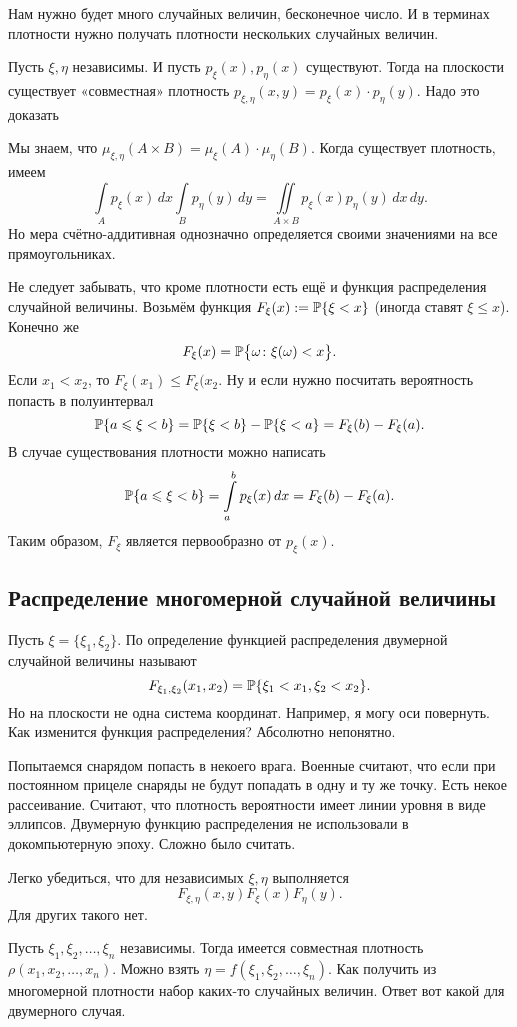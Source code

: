 Нам нужно будет много случайных величин, бесконечное число. И в терминах плотности нужно получать плотности нескольких случайных величин.

Пусть $\xi,\eta$ независимы. И пусть $p_\xi(x),p_\eta(x)$ существуют.
Тогда на плоскости существует «совместная» плотность $p_{\xi,\eta}(x,y) = p_\xi(x)\cdot p_\eta(y)$. Надо это доказать
\begin{Proof}
Мы знаем, что $\mu_{\xi,\eta}(A\times B) = \mu_\xi(A)\cdot \mu_\eta(B)$. Когда существует плотность, имеем
\[
  \int\limits_A p_\xi(x)\,dx \int\limits_B p_\eta(y)\,dy = \iint\limits_{A\times B} p_\xi(x)p_\eta(y) \,dx\,dy.
\]
Но мера счётно-аддитивная однозначно определяется своими значениями на все прямоугольниках.
\end{Proof}

Не следует забывать, что кроме плотности есть ещё и функция распределения случайной величины. Возьмём функция $F_\xi(x):= \P\{\xi<x\}$ (иногда ставят $\xi\le x$). Конечно же
\[
  F_\xi(x) = \P\big\{\omega\colon \xi(\omega)<x\big\}.
\]
Если $x_1<x_2$, то $F_\xi(x_1)\le F_\xi(x_2$. Ну и если нужно посчитать вероятность попасть в полуинтервал
\[
  \P\{a\le \xi <b\} = \P\{\xi <b\} - \P\{\xi < a\} = F_\xi(b) - F_\xi(a).
\]
В случае существования плотности можно написать
\[
  \P\{a\le \xi<b\} = \int\limits_a^b p_\xi(x)\,dx = F_\xi(b) - F_\xi(a).
\]
Таким образом, $F_\xi$ является первообразно от $p_\xi(x)$.

\subsection{Распределение многомерной случайной величины}
Пусть $\xi = \{\xi_1,\xi_2\}$. По определение функцией распределения двумерной случайной величины называют
\[
  F_{\xi_1,\xi_2}(x_1,x_2) = \P\{\xi_1<x_1,\xi_2<x_2\}.
\]
Но на плоскости не одна система координат. Например, я могу оси повернуть. Как изменится функция распределения? Абсолютно непонятно.

Попытаемся снарядом попасть в некоего врага. Военные считают, что если при постоянном прицеле снаряды не будут попадать в одну и ту же точку. Есть некое рассеивание. Считают, что плотность вероятности имеет линии уровня в виде эллипсов. Двумерную функцию распределения не использовали в докомпьютерную эпоху. Сложно было считать.

Легко убедиться, что для независимых $\xi,\eta$ выполняется
\[
  F_{\xi,\eta}(x,y)F_\xi(x) F_\eta(y).
\]
Для других такого нет.

Пусть $\xi_1,\xi_2,\dots,\xi_n$ независимы. Тогда имеется совместная плотность $\rho(x_1,x_2,\dots,x_n)$. Можно взять $\eta = f(\xi_1,\xi_2,\dots,\xi_n)$. Как получить из многомерной плотности набор каких-то случайных величин. Ответ вот какой для двумерного случая.

